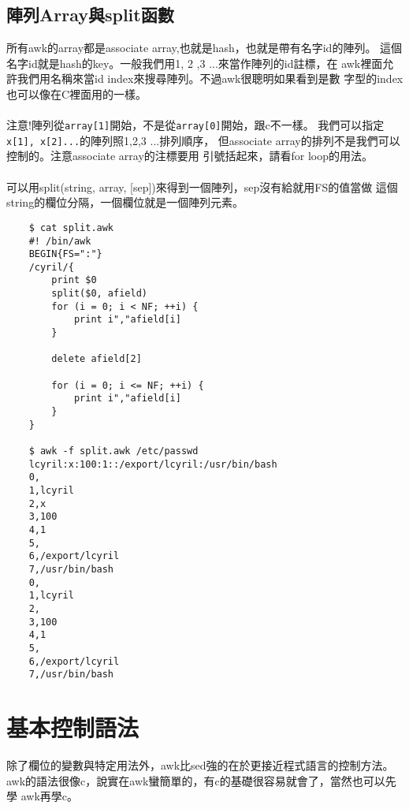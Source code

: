     \subsection{陣列Array與split函數}
    所有awk的array都是associate array,也就是hash，也就是帶有名字id的陣列。
    這個名字id就是hash的key。一般我們用1, 2 ,3 ...來當作陣列的id註標，在
    awk裡面允許我們用名稱來當id index來搜尋陣列。不過awk很聰明如果看到是數
    字型的index也可以像在C裡面用的一樣。
    \\\\
    注意!陣列從\verb=array[1]=開始，不是從\verb=array[0]=開始，跟c不一樣。
    我們可以指定\verb=x[1], x[2]...=的陣列照1,2,3 ...排列順序，
    但associate array的排列不是我們可以控制的。注意associate array的注標要用
    引號括起來，請看for loop的用法。
    \\\\
    可以用split(string, array, [sep])來得到一個陣列，sep沒有給就用FS的值當做
    這個string的欄位分隔，一個欄位就是一個陣列元素。
    \begin{verbatim}
    $ cat split.awk
    #! /bin/awk
    BEGIN{FS=":"}
    /cyril/{
        print $0
        split($0, afield)
        for (i = 0; i < NF; ++i) { 
            print i","afield[i]
        }
        
        delete afield[2]

        for (i = 0; i <= NF; ++i) {
            print i","afield[i]
        }
    }

    $ awk -f split.awk /etc/passwd
    lcyril:x:100:1::/export/lcyril:/usr/bin/bash
    0,
    1,lcyril
    2,x
    3,100
    4,1
    5,
    6,/export/lcyril
    7,/usr/bin/bash
    0,
    1,lcyril
    2,
    3,100
    4,1
    5,
    6,/export/lcyril
    7,/usr/bin/bash
    \end{verbatim}
    
    \section{基本控制語法}
    除了欄位的變數與特定用法外，awk比sed強的在於更接近程式語言的控制方法。
    awk的語法很像c，說實在awk蠻簡單的，有c的基礎很容易就會了，當然也可以先學
    awk再學c。
